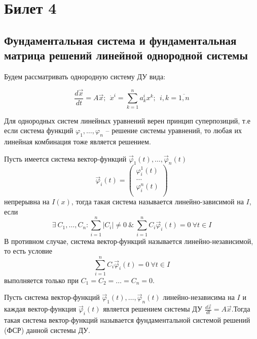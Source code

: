 


    \section*{Билет 4}
    \subsection*{Фундаментальная система и фундаментальная матрица решений линейной однородной
    системы}

    Будем рассматривать однородную систему ДУ вида:

    \begin{equation*}
        \frac{d \vec x}{dt} = A \vec x; ~~ \dot x^i = \sum^n_{k = 1} a^i_k x^k; ~~ i, k = \overline{1, n} 
    \end{equation*}

    \begin{proposition}
        Для однородных систем линейных уравнений верен принцип суперпозиций, т.е если
        система функций $\varphi_1, \dots, \varphi_n$ -- решение системы уравнений, то любая их линейная комбинация тоже
        является решением.
    \end{proposition}

    \begin{definition}
        Пусть имеется система вектор-функций $\vec \varphi_1(t), \dots, \vec \varphi_n(t)$
        \begin{equation*}
            \vec \varphi_i(t) =
            \begin{pmatrix}
                \varphi_i^1(t) \\
                \dots \\
                \varphi_i^n(t) \\
            \end{pmatrix}           
        \end{equation*}
        непрерывна на $I(x)$, тогда такая система называется
        линейно-зависимой на $I$, если \[\exists ~ C_1, \dots, C_n : \sum^n_{i = 1} |C_i| \neq 0 ~ \& ~ \sum^n_{i = 1} C_i \vec \varphi_i(t) = 0 ~ \forall t \in I\]
        В противном случае, система вектор-функций называется линейно-независимой, то есть условие
        \[\sum^n_{i = 1} C_i \vec \varphi_i(t) = 0 ~ \forall t \in I\] выполняется только при $C_1 = C_2 = \dots = C_n = 0$.
    \end{definition}

    \begin{definition}
        Пусть система вектор-функций $\vec \varphi_1(t), \dots, \vec \varphi_n(t)$ линейно-независима на $I$ и каждая вектор-функция
        $\vec \varphi_i(t)$ является решением системы ДУ $\frac{d \vec x}{dt} = A \vec x$.Тогда такая система вектор-функций
        называется фундаментальной системой решений (ФСР) данной системы ДУ.
    \end{definition}


